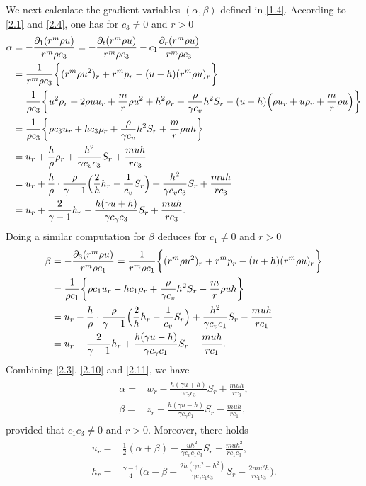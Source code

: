 \documentclass[11pt,reqno]{article}
\newcommand{\fr}{\frac}
\numberwithin{equation}{section}
\begin{document}
We next calculate the gradient variables $(\alpha, \beta)$ defined in \eqref{1.4}. According to \eqref{2.1} and \eqref{2.4}, one has for $c_3\neq0$ and $r>0$
\begin{align}\label{2.10}
\alpha
&=-\frac{\partial_1(r^m\rho u)}{r^m\rho c_3}
= -\frac{\partial_t(r^m \rho u)}{r^m\rho c_3}-c_1\frac{\partial_r(r^m \rho u)}{r^m\rho c_3}  \notag
\\
&= \fr{1}{r^m\rho c_3}\bigg\{(r^m\rho u^2)_r +r^mp_r-(u-h)(r^m\rho u)_r\bigg\}   \notag \\
&=\fr{1}{\rho c_3}\bigg\{u^2\rho_r +2\rho uu_r +\fr{m}{r}\rho u^2 +h^2\rho_r +\fr{\rho}{\gamma c_v}h^2S_r-(u-h)\Big(\rho u_r+u\rho_r+\fr{m}{r}\rho u\Big)\bigg\}  \notag \\
&=\fr{1}{\rho c_3}\bigg\{\rho c_3u_r +hc_3\rho_r +\fr{\rho}{\gamma c_v}h^2S_r +\fr{m}{r}\rho uh\bigg\}   \notag \\
&=u_r +\fr{h}{\rho}\rho_r+\fr{h^2}{\gamma c_v c_3}S_r +\fr{m uh}{rc_3}   \notag
\\
&=u_r +\fr{h}{\rho}\cdot \fr{\rho}{\gamma-1}\Big(\fr{2}{h}h_r-\fr{1}{c_v}S_r\Big)+\fr{h^2}{\gamma c_v c_3}S_r +\fr{m uh}{rc_3}   \notag \\
&=u_r +\fr{2}{\gamma-1}h_r -\fr{h(\gamma u+h)}{\gamma c_\gamma c_3}S_r +\fr{m uh}{rc_3}.
\end{align}
Doing a similar computation for $\beta$ deduces for $c_1\neq0$ and $r>0$
\begin{align}\label{2.11}
\beta
&=-\frac{\partial_3(r^m\rho u)}{r^m\rho c_1}=
\fr{1}{r^m\rho c_1}\bigg\{(r^m\rho u^2)_r +r^mp_r-(u+h)(r^m\rho u)_r\bigg\}   \notag \\
&=\fr{1}{\rho c_1}\bigg\{\rho c_1u_r -hc_1\rho_r +\fr{\rho}{\gamma c_v}h^2S_r -\fr{m}{r}\rho uh\bigg\}   \notag \\
&=u_r -\fr{h}{\rho}\cdot \fr{\rho}{\gamma-1}\Big(\fr{2}{h}h_r-\fr{1}{c_v}S_r\Big)+\fr{h^2}{\gamma c_v c_1}S_r -\fr{m uh}{rc_1}   \notag \\
&=u_r -\fr{2}{\gamma-1}h_r +\fr{h(\gamma u-h)}{\gamma c_\gamma c_1}S_r-\fr{m uh}{rc_1}.
\end{align}
Combining \eqref{2.3}, \eqref{2.10} and \eqref{2.11}, we have
\begin{align}\label{2.12}
\begin{split}
\alpha=&w_r-\fr{h(\gamma u+h)}{\gamma c_\gamma c_3}S_r +\fr{m uh}{rc_3}, \\
\beta=&z_r+\fr{h(\gamma u-h)}{\gamma c_\gamma c_1}S_r-\fr{m uh}{rc_1},
\end{split}
\end{align}
provided that $c_1 c_3\neq0$ and $r>0$. Moreover, there holds
\begin{align}\label{2.13}
\begin{split}
u_r=&\fr{1}{2}(\alpha+\beta)-\fr{uh^2}{\gamma c_v c_1c_3}S_r +\fr{muh^2}{rc_1c_3}, \\
h_r=&\fr{\gamma-1}{4}\bigg(\alpha-\beta+\frac{2h(\gamma u^2-h^2)}{\gamma c_\gamma c_1c_3}S_r-\frac{2m u^2h}{rc_1c_3}\bigg).
\end{split}
\end{align}
\end{document}

